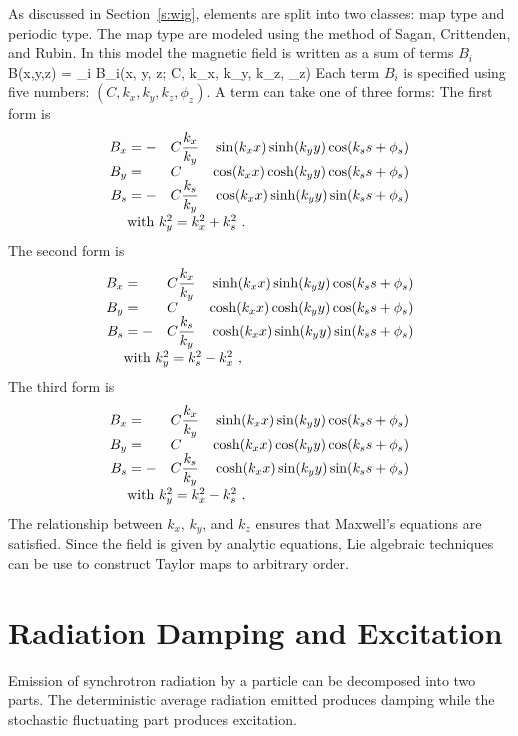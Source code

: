 As discussed in Section~\ref{s:wig}, \bmad {} elements are split into 
two classes: map type and periodic type.
 The map type  are modeled using the method of Sagan, Crittenden, 
and Rubin\cite{b:wiggler}. In this model the magnetic field is written as 
a sum of terms $B_i$
\Begineq
  B(x,y,z) = \sum_i B_i(x, y, z; C, k_x, k_y, k_z, \phi_z)
\Endeq 
Each term $B_i$ is specified using five numbers: 
$(C, k_x, k_y, k_z, \phi_z)$. A term can take one of three forms: The first
form is
\begin{alignat}{4}
  B_x &= -&C &\dfrac{k_x}{k_y} & \sin(\kxx) \sinh(\kyy) \cos(\ksss) \CRNEG
  B_y &=  &C &                 & \cos(\kxx) \cosh(\kyy) \cos(\ksss) \CRNEG
  B_s &= -&C &\dfrac{k_s}{k_y} & \cos(\kxx) \sinh(\kyy) \sin(\ksss) \CRneg
  & \makebox[1pt][l]{with $k_y^2 = k_x^2 + k_s^2$ .} &&&  \label{f1}
\end{alignat}
The second form is
\begin{alignat}{4}
  B_x &=  &C &\dfrac{k_x}{k_y} & \sinh(\kxx) \sinh(\kyy) \cos(\ksss) \CRNEG
  B_y &=  &C &                 & \cosh(\kxx) \cosh(\kyy) \cos(\ksss) \CRNEG
  B_s &= -&C &\dfrac{k_s}{k_y} & \cosh(\kxx) \sinh(\kyy) \sin(\ksss) \CRneg
  & \makebox[1pt][l]{with $k_y^2 = k_s^2 - k_x^2$ ,} &&&  \label{f2}
\end{alignat}
The third form is
\begin{alignat}{4}
  B_x &=  &C &\dfrac{k_x}{k_y} & \sinh(\kxx) \sin(\kyy) \cos(\ksss) \CRNEG
  B_y &=  &C &                 & \cosh(\kxx) \cos(\kyy) \cos(\ksss) \CRNEG
  B_s &= -&C &\dfrac{k_s}{k_y} & \cosh(\kxx) \sin(\kyy) \sin(\ksss) \CRneg
  & \makebox[1pt][l]{with $k_y^2 = k_x^2 - k_s^2$ .} &&& \label{f3}
\end{alignat}
The relationship between $k_x$, $k_y$, and $k_z$ ensures that Maxwell's equations
are satisfied. Since the field is given by analytic equations, Lie algebraic
techniques can be use to construct Taylor maps to arbitrary order.

\section{Radiation Damping and Excitation}
\label{s:radiation}

Emission of synchrotron radiation by a particle can be decomposed into
two parts. The deterministic average radiation emitted produces damping
while the stochastic fluctuating part produces excitation\cite{b:jowett}.

